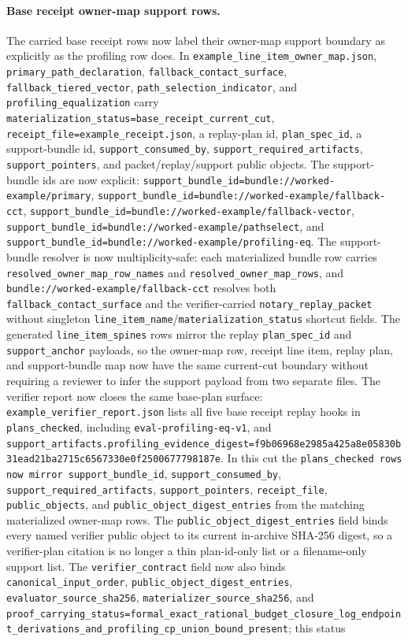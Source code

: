 \documentclass[11pt]{article}
\begin{document}
\paragraph{Base receipt owner-map support rows.}
The carried base receipt rows now label their owner-map support boundary as explicitly as the profiling row does. In \nolinkurl{example_line_item_owner_map.json}, \nolinkurl{primary_path_declaration}, \nolinkurl{fallback_contact_surface}, \nolinkurl{fallback_tiered_vector}, \nolinkurl{path_selection_indicator}, and \nolinkurl{profiling_equalization} carry \nolinkurl{materialization_status=base_receipt_current_cut}, \nolinkurl{receipt_file=example_receipt.json}, a replay-plan id, \nolinkurl{plan_spec_id}, a support-bundle id, \nolinkurl{support_consumed_by}, \nolinkurl{support_required_artifacts}, \nolinkurl{support_pointers}, and packet/replay/support public objects. The support-bundle ids are now explicit: \nolinkurl{support_bundle_id=bundle://worked-example/primary}, \nolinkurl{support_bundle_id=bundle://worked-example/fallback-cct}, \nolinkurl{support_bundle_id=bundle://worked-example/fallback-vector}, \nolinkurl{support_bundle_id=bundle://worked-example/pathselect}, and \nolinkurl{support_bundle_id=bundle://worked-example/profiling-eq}. The support-bundle resolver is now multiplicity-safe: each materialized bundle row carries \nolinkurl{resolved_owner_map_row_names} and \nolinkurl{resolved_owner_map_rows}, and \nolinkurl{bundle://worked-example/fallback-cct} resolves both \nolinkurl{fallback_contact_surface} and the verifier-carried \nolinkurl{notary_replay_packet} without singleton \nolinkurl{line_item_name}/\nolinkurl{materialization_status} shortcut fields. The generated \nolinkurl{line_item_spines} rows mirror the replay \nolinkurl{plan_spec_id} and \nolinkurl{support_anchor} payloads, so the owner-map row, receipt line item, replay plan, and support-bundle map now have the same current-cut boundary without requiring a reviewer to infer the support payload from two separate files. The verifier report now closes the same base-plan surface: \nolinkurl{example_verifier_report.json} lists all five base receipt replay hooks in \nolinkurl{plans_checked}, including \nolinkurl{eval-profiling-eq-v1}, and \nolinkurl{support_artifacts.profiling_evidence_digest=f9b06968e2985a425a8e05830b31ead21ba2715c6567330e0f2500677798187e}. In this cut the \nolinkurl{plans_checked rows now mirror support_bundle_id}, \nolinkurl{support_consumed_by}, \nolinkurl{support_required_artifacts}, \nolinkurl{support_pointers}, \nolinkurl{receipt_file}, \nolinkurl{public_objects}, and \nolinkurl{public_object_digest_entries} from the matching materialized owner-map rows. The \nolinkurl{public_object_digest_entries} field binds every named verifier public object to its current in-archive SHA-256 digest, so a verifier-plan citation is no longer a thin plan-id-only list or a filename-only support list. The \nolinkurl{verifier_contract} field now also binds \nolinkurl{canonical_input_order}, \nolinkurl{public_object_digest_entries}, \nolinkurl{evaluator_source_sha256}, \nolinkurl{materializer_source_sha256}, and \nolinkurl{proof_carrying_status=formal_exact_rational_budget_closure_log_endpoint_derivations_and_profiling_cp_union_bound_present}; this status 
\end{document}
